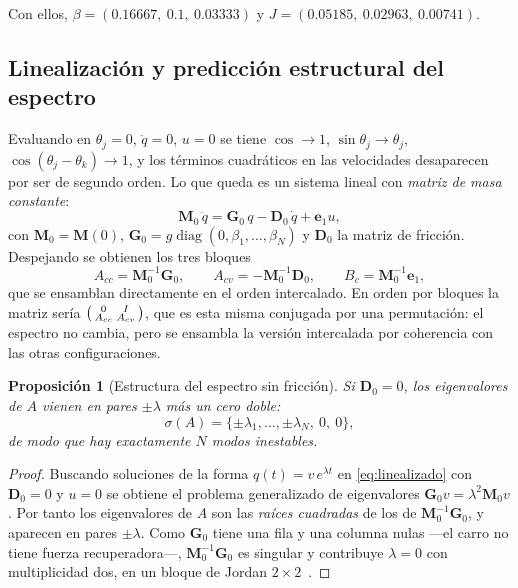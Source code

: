 \documentclass[11pt,letterpaper]{article}
\theoremstyle{definition}
\theoremstyle{plain}
\newtheorem{proposicion}[definicion]{Proposición}
\theoremstyle{remark}
\DeclareMathOperator{\diag}{diag}
\newcommand{\spec}{\sigma}
\newcommand{\Mm}{\bm{M}}
\newcommand{\Gm}{\bm{G}}
\newcommand{\Dm}{\bm{D}}
\begin{document}
Con ellos, $\beta=(0.16667,\ 0.1,\ 0.03333)$ y
$J=(0.05185,\ 0.02963,\ 0.00741)$.

\subsection{Linealización y predicción estructural del espectro}
\label{sec:linealizacion}

Evaluando en $\theta_j=0$, $\dot q=0$, $u=0$ se tiene $\cos\to1$,
$\sin\theta_j\to\theta_j$, $\cos(\theta_j-\theta_k)\to1$, y los términos
cuadráticos en las velocidades desaparecen por ser de segundo orden. Lo que
queda es un sistema lineal con \emph{matriz de masa constante}:
\begin{equation}
\Mm_0\,\ddot q=\Gm_0\,q-\Dm_0\,\dot q+\bm{e}_1u,
\label{eq:linealizado}
\end{equation}
con $\Mm_0=\Mm(0)$, $\Gm_0=g\diag(0,\beta_1,\dots,\beta_N)$ y $\Dm_0$ la matriz
de fricción. Despejando se obtienen los tres bloques
\[
A_{cc}=\Mm_0^{-1}\Gm_0,\qquad A_{cv}=-\Mm_0^{-1}\Dm_0,\qquad
B_c=\Mm_0^{-1}\bm{e}_1,
\]
que se ensamblan directamente en el orden intercalado. En orden por bloques la
matriz sería $\begin{psmallmatrix}0&I\\A_{cc}&A_{cv}\end{psmallmatrix}$, que es
esta misma conjugada por una permutación: el espectro no cambia, pero se
ensambla la versión intercalada por coherencia con las otras configuraciones.

\begin{proposicion}[Estructura del espectro sin fricción]
\label{prop:espectro}
Si $\Dm_0=0$, los eigenvalores de $A$ vienen en pares $\pm\lambda$ más un cero
doble:
\[
\spec(A)=\{\pm\lambda_1,\dots,\pm\lambda_N,\ 0,\ 0\},
\]
de modo que hay exactamente $N$ modos inestables.
\end{proposicion}

\begin{proof}
Buscando soluciones de la forma $q(t)=v\,e^{\lambda t}$ en
\cref{eq:linealizado} con $\Dm_0=0$ y $u=0$ se obtiene el problema generalizado
de eigenvalores $\Gm_0 v=\lambda^2\Mm_0 v$. Por tanto los eigenvalores de $A$
son las \emph{raíces cuadradas} de los de $\Mm_0^{-1}\Gm_0$, y aparecen en pares
$\pm\lambda$. Como $\Gm_0$ tiene una fila y una columna nulas ---el carro no
tiene fuerza recuperadora---, $\Mm_0^{-1}\Gm_0$ es singular y contribuye
$\lambda=0$ con multiplicidad dos, en un bloque de Jordan
$2\times2$~\cite{hoffman1971,olver2018}.
\end{proof}
\end{document}
